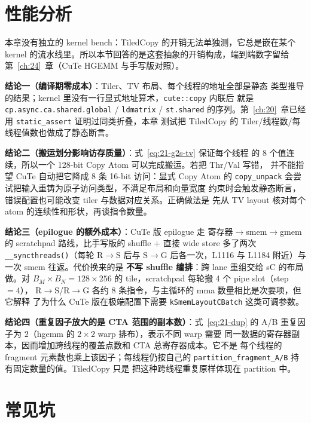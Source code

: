 \section{性能分析}

本章没有独立的 kernel bench：TiledCopy 的开销无法单独测，它总是嵌在某个
kernel 的流水线里。所以本节回答的是这套抽象的开销构成，端到端数字留给
第~\ref{ch:24}~章（CuTe HGEMM 与手写版对照）。

\textbf{结论一（编译期零成本）}：Tiler、TV 布局、每个线程的地址全部是静态
类型推导的结果；kernel 里没有一行显式地址算术，\texttt{cute::copy} 内联后
就是 \texttt{cp.\allowbreak{}async.\allowbreak{}ca.\allowbreak{}shared.\allowbreak{}global} / \texttt{ldmatrix} / \texttt{st.shared}
的序列。第~\ref{ch:20}~章已经用 \texttt{static\_\allowbreak{}assert} 证明过同类折叠，本章
测试把 TiledCopy 的 Tiler/线程数/每线程值数也做成了静态断言。

\textbf{结论二（搬运划分影响访存质量）}：式~\eqref{eq:21-g2s-tv} 保证每个线程
的 8 个值连续，所以一个 128-bit Copy Atom 可以完成搬运。若把 Thr/Val 写错，
并不能指望 CuTe 自动把它降成 8 条 16-bit 访问：显式 Copy Atom 的
\texttt{copy\_unpack} 会尝试把输入重铸为原子访问类型，不满足布局和向量宽度
约束时会触发静态断言，错误配置也可能改变 tiler 与数据对应关系。正确做法是
先从 TV layout 核对每个 atom 的连续性和形状，再谈指令数量。

\textbf{结论三（epilogue 的额外成本）}：CuTe 版 epilogue 走
寄存器$\to$smem$\to$gmem 的 scratchpad 路线，比手写版的 shuffle $+$ 直接
wide store 多了两次 \texttt{\_\allowbreak{}\_\allowbreak{}syncthreads\allowbreak{}()}（每轮 R$\to$S 后与
S$\to$G 后各一次，L1116 与 L1184 附近）与一次 smem 往返。代价换来的是
\textbf{不写 shuffle 编排}：跨 lane 重组交给 sC 的布局做。对 $B_M\times B_N
=128\times256$ 的 tile，scratchpad 每轮搬 4 个 pipe slot（step $=4$），
R$\to$S/R$\to$G 各约 8 条指令，与主循环的 mma 数量相比是次要项，但它解释
了为什么 CuTe 版在极端配置下需要 \texttt{kSmemLayoutCBatch} 这类可调参数。

\textbf{结论四（重复因子放大的是 CTA 范围的副本数）}：式~\eqref{eq:21-dup} 的
A/B 重复因子为 $2$（hgemm 的 $2\times2$ warp 排布），表示不同 warp 需要
同一数据的寄存器副本，因而增加跨线程的覆盖点数和 CTA 总寄存器成本。它不是
每个线程的 fragment 元素数也乘上该因子；每线程仍按自己的
\texttt{partition\_\allowbreak{}fragment\_\allowbreak{}A/B} 持有固定数量的值。TiledCopy 只是
把这种跨线程重复原样体现在 partition 中。

\section{常见坑}

